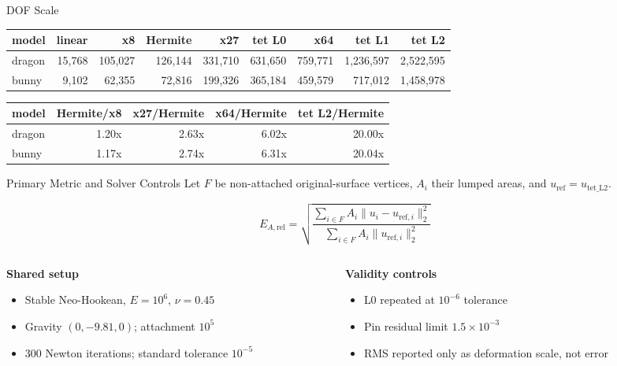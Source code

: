 \documentclass[aspectratio=169,10pt]{beamer}
\begin{document}
\begin{frame}{DOF Scale}
  \scriptsize
  \begin{table}
    \centering
    \begin{tabular}{lrrrrrrrr}
      \toprule
      model & linear & x8 & Hermite & x27 & tet L0 & x64 & tet L1 & tet L2 \\
      \midrule
      dragon & 15,768 & 105,027 & 126,144 & 331,710 & 631,650 & 759,771 & 1,236,597 & 2,522,595 \\
      bunny & 9,102 & 62,355 & 72,816 & 199,326 & 365,184 & 459,579 & 717,012 & 1,458,978 \\
      \bottomrule
    \end{tabular}
  \end{table}

  \vspace{0.8em}
  \begin{table}
    \centering
    \begin{tabular}{lrrrr}
      \toprule
      model & Hermite/x8 & x27/Hermite & x64/Hermite & tet L2/Hermite \\
      \midrule
      dragon & 1.20x & 2.63x & 6.02x & 20.00x \\
      bunny & 1.17x & 2.74x & 6.31x & 20.04x \\
      \bottomrule
    \end{tabular}
  \end{table}
\end{frame}

\begin{frame}{Primary Metric and Solver Controls}
  \small
  Let $F$ be non-attached original-surface vertices, $A_i$ their lumped areas,
  and $u_{\mathrm{ref}}=u_{\mathrm{tet\_L2}}$.

  \[
    E_{A,\mathrm{rel}} =
    \sqrt{\frac{\sum_{i\in F} A_i\|u_i-u_{\mathrm{ref},i}\|_2^2}
                 {\sum_{i\in F} A_i\|u_{\mathrm{ref},i}\|_2^2}}
  \]

  \begin{columns}[T]
    \begin{column}{0.49\linewidth}
      \textbf{Shared setup}
      \begin{itemize}
        \item Stable Neo-Hookean, $E=10^6$, $\nu=0.45$
        \item Gravity $(0,-9.81,0)$; attachment $10^5$
        \item 300 Newton iterations; standard tolerance $10^{-5}$
      \end{itemize}
    \end{column}
    \begin{column}{0.49\linewidth}
      \textbf{Validity controls}
      \begin{itemize}
        \item L0 repeated at $10^{-6}$ tolerance
        \item Pin residual limit $1.5\times10^{-3}$
        \item RMS reported only as deformation scale, not error
      \end{itemize}
    \end{column}
  \end{columns}
\end{frame}
\end{document}
